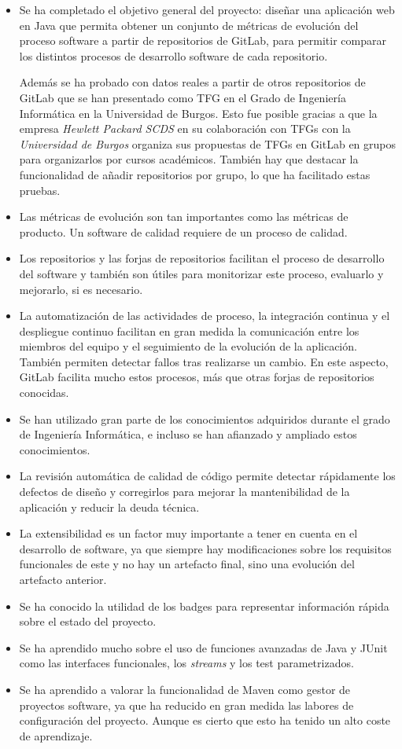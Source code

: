 \begin{itemize}
	\item Se ha completado el objetivo general del proyecto: diseñar una aplicación web en Java que permita obtener un conjunto de métricas de evolución del proceso software \citep{ratzinger_space:_2007} a partir de repositorios de GitLab, para permitir comparar los distintos procesos de desarrollo software de cada repositorio. 
	
	Además se ha probado con datos reales a partir de otros repositorios de GitLab que se han presentado como TFG en el Grado de Ingeniería Informática en la Universidad de Burgos. Esto fue posible gracias a que la empresa \textit{Hewlett Packard SCDS} en su colaboración con TFGs con la \textit{Universidad de Burgos} organiza sus propuestas de TFGs en GitLab en grupos para organizarlos por cursos académicos. También hay que destacar la funcionalidad de añadir repositorios por grupo, lo que ha facilitado estas pruebas.
	
	\item Las métricas de evolución son tan importantes como las métricas de producto. Un software de calidad requiere de un proceso de calidad.
	\item Los repositorios y las forjas de repositorios facilitan el proceso de desarrollo del software y también son útiles para monitorizar este proceso, evaluarlo y mejorarlo, si es necesario.
	\item La automatización de las actividades de proceso, la integración continua y el despliegue continuo facilitan en gran medida la comunicación entre los miembros del equipo y el seguimiento de la evolución de la aplicación. También permiten detectar fallos tras realizarse un cambio. En este aspecto, GitLab facilita mucho estos procesos, más que otras forjas de repositorios conocidas.
	\item Se han utilizado gran parte de los conocimientos adquiridos durante el grado de Ingeniería Informática, e incluso se han afianzado y ampliado estos conocimientos.
	\item La revisión automática de calidad de código permite detectar rápidamente los defectos de diseño y corregirlos para mejorar la mantenibilidad de la aplicación y reducir la deuda técnica.
	\item La extensibilidad es un factor muy importante a tener en cuenta en el desarrollo de software, ya que siempre hay modificaciones sobre los requisitos funcionales de este y no hay un artefacto final, sino una evolución del artefacto anterior.
	\item Se ha conocido la utilidad de los badges para representar información rápida sobre el estado del proyecto.
	\item Se ha aprendido mucho sobre el uso de funciones avanzadas de Java y JUnit como las interfaces funcionales, los \textit{streams} y los test parametrizados.
	\item Se ha aprendido a valorar la funcionalidad de Maven como gestor de proyectos software, ya que ha reducido en gran medida las labores de configuración del proyecto. Aunque es cierto que esto ha tenido un alto coste de aprendizaje.
\end{itemize}

